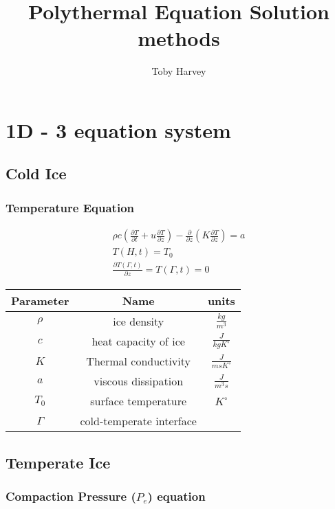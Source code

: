\documentclass[a4paper,12pt]{article}
\newcommand{\pd}[2]{\frac{\partial #1}{\partial #2}}
\begin{document}
\title{Polythermal Equation Solution methods}
\author{Toby Harvey}
\maketitle
\vspace{-1cm}

\section{1D - 3 equation system}

\subsection{Cold Ice}

\subsubsection{Temperature Equation}
\begin{align}
  \rho c \left(\pd{T}{t} + u \pd{T}{z}\right) - \pd{}z\left(K \pd{T}{z}\right) = a \\
  T(H,t) = T_0\\
  \pd{T(\Gamma,t)}{z} = T(\Gamma,t) = 0
\end{align}

\begin{center}
\begin{tabular}{ |c|c|c| } 
 \hline
  Parameter & Name & units\\
  \hline
  $\rho$ & ice density & $\frac{kg}{m^3}$\\
  \hline
  $c$ & heat capacity of ice & $\frac{J}{kg K^\circ}$\\
  \hline
  $K$ & Thermal conductivity & $\frac{J}{ ms K^\circ}$\\
  \hline
  $a$ & viscous dissipation & $\frac{J}{m^3 s}$\\
  \hline
  $T_0$ & surface temperature & $K^\circ$\\
  \hline
  $\Gamma$ & cold-temperate interface & \\
  \hline
\end{tabular}
\end{center}

\subsection{Temperate Ice}

\subsubsection{Compaction Pressure ($P_e$) equation}
\end{document}
